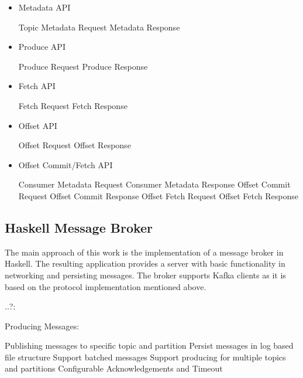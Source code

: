 \begin{itemize}
    \item Metadata API
    \begin{itemize}
        \tick Topic Metadata Request
        \tick Metadata Response
    \end{itemize}
    \item Produce API
    \begin{itemize}
        \tick Produce Request
        \tick Produce Response
    \end{itemize}
    \item Fetch API
    \begin{itemize}
        \tick Fetch Request
        \tick Fetch Response
    \end{itemize}
    \item Offset API
    \begin{itemize}
        \fail Offset Request
        \fail Offset Response
    \end{itemize}

    \item Offset Commit/Fetch API
    \begin{itemize}
        \fail Consumer Metadata Request
        \fail Consumer Metadata Response
        \fail Offset Commit Request
        \fail Offset Commit Response
        \fail Offset Fetch Request
        \fail Offset Fetch Response
    \end{itemize}
\end{itemize}

\subsection{Haskell Message Broker}
The main approach of this work is the implementation of a message broker in
Haskell. The resulting application provides a server with basic functionality
in networking and persisting messages. The broker supports Kafka clients as
it is based on the protocol implementation mentioned above.

..?: 

Producing Messages: 
\begin{itemize}
        \tick Publishing messages to specific topic and partition
        \tick Persist messages in log based file structure
        \tick Support batched messages 
        \tick Support producing for multiple topics and partitions
        \fail Configurable Acknowledgements and Timeout
\end{itemize}

